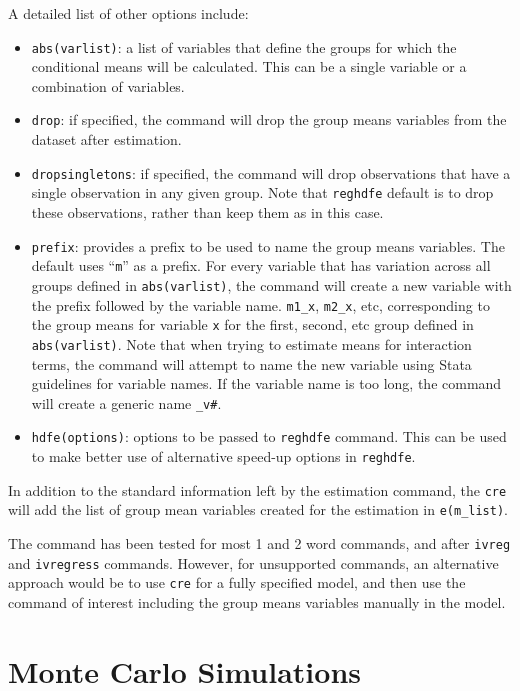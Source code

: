 \documentclass[bib]{statapress}
\providecommand{\tightlist}{%
  \setlength{\itemsep}{0pt}\setlength{\parskip}{0pt}}\usepackage{longtable,booktabs,array}
\begin{document}
A detailed list of other options include:

\begin{itemize}
\tightlist
\item
  \texttt{abs(varlist)}: a list of variables that define the groups for
  which the conditional means will be calculated. This can be a single
  variable or a combination of variables.
\item
  \texttt{drop}: if specified, the command will drop the group means
  variables from the dataset after estimation.
\item
  \texttt{dropsingletons}: if specified, the command will drop
  observations that have a single observation in any given group. Note
  that \texttt{reghdfe} default is to drop these observations, rather
  than keep them as in this case.
\item
  \texttt{prefix}: provides a prefix to be used to name the group means
  variables. The default uses ``\texttt{m}'' as a prefix. For every
  variable that has variation across all groups defined in
  \texttt{abs(varlist)}, the command will create a new variable with the
  prefix followed by the variable name. \texttt{m1\_x}, \texttt{m2\_x},
  etc, corresponding to the group means for variable \texttt{x} for the
  first, second, etc group defined in \texttt{abs(varlist)}. Note that
  when trying to estimate means for interaction terms, the command will
  attempt to name the new variable using Stata guidelines for variable
  names. If the variable name is too long, the command will create a
  generic name \texttt{\_v\#}.
\item
  \texttt{hdfe(options)}: options to be passed to \texttt{reghdfe}
  command. This can be used to make better use of alternative speed-up
  options in \texttt{reghdfe}.
\end{itemize}

In addition to the standard information left by the estimation command,
the \texttt{cre} will add the list of group mean variables created for
the estimation in \texttt{e(m\_list)}.

The command has been tested for most 1 and 2 word commands, and after
\texttt{ivreg} and \texttt{ivregress} commands. However, for unsupported
commands, an alternative approach would be to use \texttt{cre} for a
fully specified model, and then use the command of interest including
the group means variables manually in the model.

\section{Monte Carlo Simulations}\label{sec-4}
\end{document}

